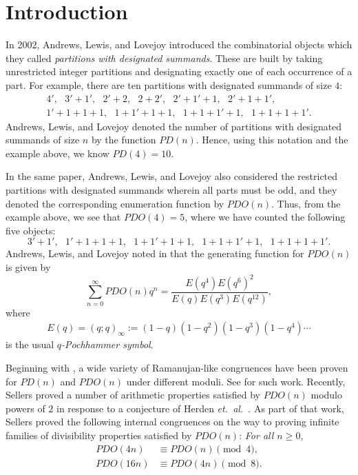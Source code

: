 \documentclass[12pt,reqno]{amsart}
\numberwithin{equation}{section}
\theoremstyle{theorem}
\theoremstyle{definition}
\begin{document}
\section{Introduction}  
In 2002, Andrews, Lewis, and Lovejoy \cite{ALL} introduced the combinatorial objects which they called {\it partitions with designated summands}.  These are built by taking unrestricted integer partitions and designating exactly one of each occurrence of a part.  For example, there are ten partitions with designated summands of size $4$:  
\begin{gather*}
    4',\ \ \  3'+1',\ \ \  2'+2,\ \ \  2+2',\ \ \  2'+1'+1,\ \ \  2'+1+1',\\
    1'+1+1+1,\ \ \  1+1'+1+1,\ \ \  1+1+1'+1,\ \ \  1+1+1+1'.
\end{gather*}
Andrews, Lewis, and Lovejoy denoted the number of partitions with designated summands of size $n$ by the function $PD(n)$.  Hence, using this notation and the example above, we know $PD(4)=10$.

In the same paper, Andrews, Lewis, and Lovejoy \cite{ALL} also considered the restricted partitions with designated summands wherein all parts must be odd, and they denoted the corresponding enumeration function by $PDO(n)$.  Thus, from the example above, we see that $PDO(4)=5$, where we have counted the following five objects:  
$$
3'+1',\ \ \  1'+1+1+1,\ \ \  1+1'+1+1,\ \ \  1+1+1'+1,\ \ \  1+1+1+1'.
$$
Andrews, Lewis, and Lovejoy noted in \cite[eq.~(1.6)]{ALL} that the generating function for $PDO(n)$ is given by 
\begin{equation}
    \label{genfn_main}
    \sum_{n=0}^{\infty} PDO(n)q^n = \frac{E(q^4)E(q^6)^2}{E(q)E(q^3)E(q^{12})},
\end{equation}
where
\begin{align*}
    E(q) = (q;q)_\infty := (1-q)(1-q^{2})(1-q^{3})(1-q^{4})\cdots
\end{align*}
is the usual \emph{$q$-Pochhammer symbol}.  

Beginning with \cite{ALL}, a wide variety of Ramanujan-like congruences have been proven for $PD(n)$ and $PDO(n)$ under different moduli.  See \cite{ACX2018, BK, BO, CJJS, dSS3, dSSk, HBN, NG, Xia} for such work. Recently, Sellers \cite{Sel23} proved a number of arithmetic properties satisfied by $PDO(n)$ modulo powers of $2$ in response to a conjecture of Herden \textit{et.~al.~}\cite{Her}. As part of that work,  Sellers proved the following internal congruences on the way to proving infinite families of divisibility properties satisfied by $PDO(n)$:  
\textit{For all $n\geq 0$}, 
\begin{align}
PDO(4n) &\equiv PDO(n) \pmod{4}, \\
PDO(16n) &\equiv PDO(4n) \pmod{8}. \label{cong_mod_8}  
\end{align}
\end{document}
